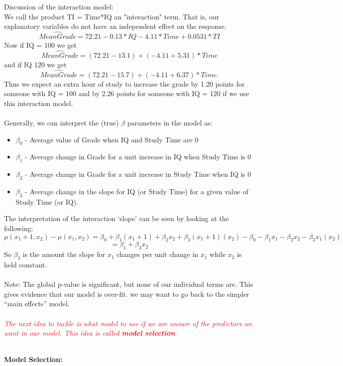 \documentclass{article}
\begin{document}
Discussion of the interaction model:\\
 We call the product TI = Time*IQ an "interaction" term. That is, our explanatory variables do not have an independent effect on the response.
$$ \widehat{Mean Grade} = 72.21 - 0.13*IQ - 4.11*Time + 0.0531*TI$$ 
Now if IQ = 100 we get
$$ \widehat{Mean Grade} = (72.21 - 13.1) + (- 4.11 + 5.31)*Time$$
and if IQ  120 we get
$$ \widehat{Mean Grade} = (72.21 - 15.7) + (- 4.11 + 6.37)*Time.$$
Thus we expect an extra hour of study to increase the grade by 1.20 points for someone with IQ = 100 and by 2.26 points for someone with IQ = 120 if we use this interaction model.\\~\\
Generally, we can interpret the (true) $\beta$ parameters in the model as:
\begin{itemize}
\item $\beta_0$ - Average value of Grade when IQ and Study Time are 0
\item $\beta_1$ - Average change in Grade for a unit increase in IQ when Study Time is 0
\item $\beta_2$ - Average change in Grade for a unit increase in Study Time when IQ is 0
\item $\beta_3$ - Average change in the slope for IQ (or Study Time) for a given value of Study Time (or IQ).
\end{itemize}
The interpretation of the interaction `slope' can be seen by looking at the following:
$$\mu(x_1+1,x_2)-\mu(x_1,x_2)=\beta_0+\beta_1(x_1+1)+\beta_2x_2+\beta_3(x_1+1)(x_2)-\beta_0-\beta_1x_1-\beta_2x_2-\beta_3x_1(x_2)$$
$$=\beta_1+\beta_3x_2$$
So $\beta_3$ is the amount the slope for $x_1$ changes per unit change in $x_1$ while $x_2$ is held constant.\\~\\

Note:  The global p-value is significant, but none of our individual terms are.   This gives evidence that our model is over-fit.  we may want to go back to the simpler ``main effects'' model.  \\~\\

\textit{\textcolor{red}{The next idea to tackle is what model to use if we are unsure of the predictors we want in our model.  This idea is called \textbf{model selection}.}}\\~\\

\newpage

\textbf{Model Selection:}\\
\end{document}
